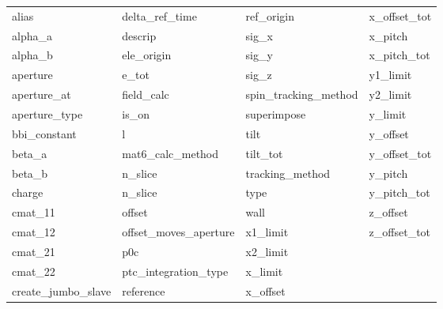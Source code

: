  \begin{tabular}{llll} \toprule
alias                       & delta_ref_time              & ref_origin                  & x_offset_tot                \\
alpha_a                     & descrip                     & sig_x                       & x_pitch                     \\
alpha_b                     & ele_origin                  & sig_y                       & x_pitch_tot                 \\
aperture                    & e_tot                       & sig_z                       & y1_limit                    \\
aperture_at                 & field_calc                  & spin_tracking_method        & y2_limit                    \\
aperture_type               & is_on                       & superimpose                 & y_limit                     \\
bbi_constant                & l                           & tilt                        & y_offset                    \\
beta_a                      & mat6_calc_method            & tilt_tot                    & y_offset_tot                \\
beta_b                      & n_slice                     & tracking_method             & y_pitch                     \\
charge                      & n_slice                     & type                        & y_pitch_tot                 \\
cmat_11                     & offset                      & wall                        & z_offset                    \\
cmat_12                     & offset_moves_aperture       & x1_limit                    & z_offset_tot                \\
cmat_21                     & p0c                         & x2_limit                    &                             \\
cmat_22                     & ptc_integration_type        & x_limit                     &                             \\
create_jumbo_slave          & reference                   & x_offset                    &                             \\
 \bottomrule
 \end{tabular}
 \vfill
 
